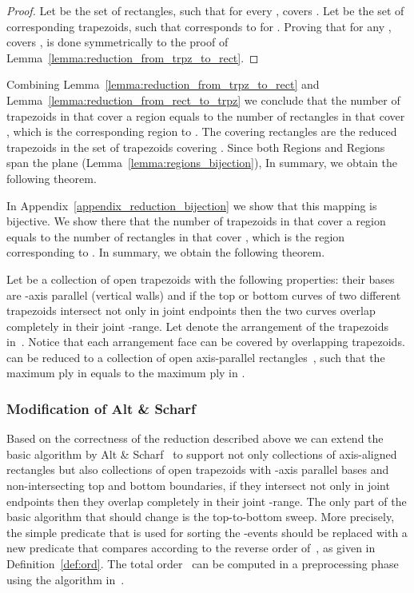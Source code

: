 {\begin{proof}
Let 
be the set of rectangles,
such that for every ,  covers .
Let 
be the set of corresponding
trapezoids, such that  corresponds to  for
.
Proving that for any ,  covers ,
is done symmetrically to the proof of Lemma~\ref{lemma:reduction_from_trpz_to_rect}.
\myqed
\end{proof}

Combining Lemma~\ref{lemma:reduction_from_trpz_to_rect} and
Lemma~\ref{lemma:reduction_from_rect_to_trpz}
we conclude that the number of trapezoids in \TcollReduc
that cover a region  equals to the number
of rectangles in \RcollReduc that cover , which is
the corresponding region to .
The covering rectangles are the reduced trapezoids
in the set of trapezoids covering .
Since both Regions
and Regions span the plane
(Lemma~\ref{lemma:regions_bijection}),
In summary, we obtain the following theorem.
}
{
In Appendix~\ref{appendix_reduction_bijection} we show that this mapping is bijective.
We show there that the number of trapezoids in \TcollReduc
that cover a region  equals to the number
of rectangles in \RcollReduc that cover , which is
the region corresponding to .
In summary, we obtain the following theorem.
}

\begin{theorem}
\label{theorem:reduction_correctness}
Let \TcollReduc be a collection of
open trapezoids with the following properties:
their bases are -axis parallel (vertical walls) and if
the top or bottom curves of two different trapezoids intersect
not only in joint endpoints
then the two curves overlap completely in their joint -range.
Let \Arr{\TcollReduc} denote the arrangement
of the trapezoids in~\TcollReduc. Notice
that each arrangement face can be covered by
overlapping trapezoids.
\TcollReduc can be reduced to a collection of open
axis-parallel rectangles~\RcollReduc,
such that the maximum ply in \Arr{\RcollReduc} equals
to the maximum ply in \Arr{\TcollReduc}.
\end{theorem}


\subsubsection{ Modification of Alt \& Scharf}
\label{subsubsubsec:eff_ver_alg:depth_general}

Based on the correctness of the reduction
described above we can extend the basic algorithm by Alt \& Scharf~\cite{as-cdaaa-13}
to support not only collections of axis-aligned rectangles but
also collections of open trapezoids with -axis parallel bases and
non-intersecting top and bottom boundaries, if they intersect
not only in joint endpoints
then they overlap completely in their joint -range.
The only part of the basic algorithm that should change
is the top-to-bottom sweep.
More precisely, the simple predicate that is used for sorting the -events
should be replaced with a new predicate that
compares according to the reverse order of~, as given in Definition~\ref{def:ord}.
The total order~ can be computed in a preprocessing phase
using the algorithm in~\cite{OW-TSLS-83}.


